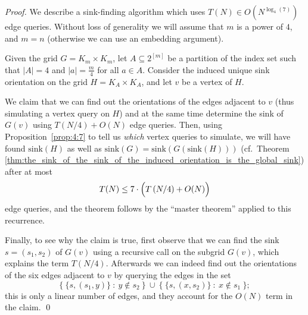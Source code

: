 \documentclass[runningheads,a4paper]{llncs}
\newcommand{\sink}{\ensuremath{\mathrm{sink}}}
\begin{document}
\begin{proof}
    We describe a sink-finding algorithm which uses
    $T(N) \in O(N ^ {\log_4(7)})$ edge queries.
    Without loss of generality we will assume that $m$ is a power of $4$, and
    $m=n$ (otherwise we can use an embedding argument).

    Given the grid $G = K_m \times K_m$, let $A \subseteq 2 ^ {[m]}$
    be a partition of the index set such that
    $|A| = 4$ and $|a| = \frac{m}{4}$ for all $a \in A$.
    Consider the induced unique sink orientation on the grid
    $H = K_{A} \times K_{A}$, and let $v$ be a vertex of $H$.

    We claim that we can find out the orientations of the edges adjacent to
    $v$ (thus simulating a vertex query on $H$)
    and at the same time determine the sink of $G(v)$ using
    $T( N/4 ) + O(N)$
    edge queries.
    Then, using Proposition~\ref{prop:4:7} to tell us \emph{which} vertex
    queries to simulate, we will have found $\sink(H)$ as well as
    $\sink(G) = \sink(G(\sink(H)))$ (cf.~Theorem
    \ref{thm:the_sink_of_the_sink_of_the_induced_orientation_is_the_global_sink})
    after at most
    \[
        T(N) \le 7 \cdot \Bigl( T \left( N/4 \right) + O(N) \Bigr)
    \]
    edge queries, and the theorem follows by the ``master theorem'' applied to
    this recurrence.

    Finally, to see why the claim is true, first observe that we can find the
    sink $s = (s_1,s_2)$ of $G(v)$ using a recursive call on the subgrid
    $G(v)$, which explains the term $T(N/4)$.
    Afterwards we can indeed find out the orientations of the six edges
    adjacent to $v$ by querying the edges in the set
    \[
        \bigl\{~ \{ s,(s_1,y) \} ~:~ y \notin s_2 ~\bigr\}
        ~\cup~
        \bigl\{~ \{ s,(x,s_2) \} ~:~ x \notin s_1 ~\bigr\};
    \]
    this is only a linear number of edges, and they account for the $O(N)$
    term in the claim.
    \qed
\end{proof}



\end{document}
